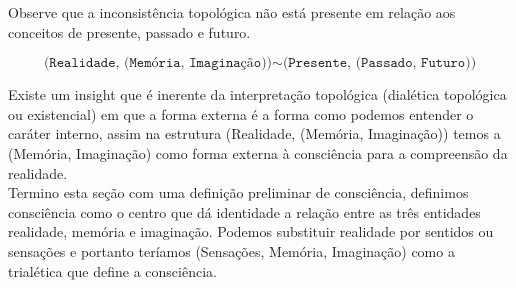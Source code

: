 \documentclass[10pt,a4paper]{report}
\begin{document}
Observe que a inconsistência topológica não está presente em relação aos conceitos de presente, passado e futuro.

$$ \texttt{(Realidade, (Memória, Imaginação))} \sim \texttt{(Presente, (Passado, Futuro))} $$

Existe um insight que é inerente da interpretação topológica (dialética topológica ou existencial) em que a forma externa é a forma como podemos entender o caráter interno, assim na estrutura (Realidade, (Memória, Imaginação)) temos a (Memória, Imaginação) como forma externa à consciência para a compreensão da realidade.  \\





Termino esta seção com uma definição preliminar de consciência, definimos consciência como o centro que dá identidade a relação entre as três entidades realidade, memória e imaginação. Podemos substituir realidade por sentidos ou sensações e portanto teríamos (Sensações, Memória, Imaginação) como a trialética que define a consciência.




\end{document}
